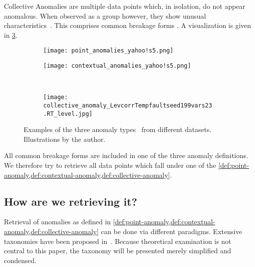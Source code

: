 \begin{definition}\label{def:collective-anomaly}
    Collective Anomalies are multiple data points which, in isolation, do not appear
    anomalous. When observed as a group however, they show unusual
    characteristics~\cite[cf.][]{Chandola.2009}. This comprises common breakage
    forms . A visualization is given in
    \cref{fig:collective-anomaly}.
\end{definition}

\begin{figure}[htp!]
    \begin{subfigure}[b]{.45\linewidth}
        \centering
        \texttt{[image: point\_anomalies\_yahoo!s5.png]}
        \label{fig:point-anomaly}
    \end{subfigure}%
    \hfill
    \begin{subfigure}[b]{.45\linewidth}
        \centering
        \texttt{[image: contextual\_anomalies\_yahoo!s5.png]}
        \label{fig:contextual-anomaly}
    \end{subfigure}\\[1ex]
    \begin{subfigure}[b]{\linewidth}
        \centering
        \texttt{[image: collective\_anomaly\_LevcorrTempfaultseed199vars23.RT\_level.jpg]}
        \label{fig:collective-anomaly}
    \end{subfigure}
    \caption{Examples of the three anomaly types~\cite{Chandola.2009} from different datasets. Illustrations by the author.}\label{fig:anomaly-types}
\end{figure}

All common breakage forms are included in one of the three anomaly definitions.
We therefore try to retrieve all data points which fall under one of the
\cref{def:point-anomaly,def:contextual-anomaly,def:collective-anomaly}.


\subsection{How are we retrieving it?}
Retrieval of anomalies as defined in \cref{def:point-anomaly,def:contextual-anomaly,def:collective-anomaly}
can be done via different paradigms. Extensive taxonomies have been proposed in~\cite{Chandola.2009,Zietlow.2020}.
Because theoretical examination is not central to this paper, the taxonomy will
be presented merely simplified and condensed.


